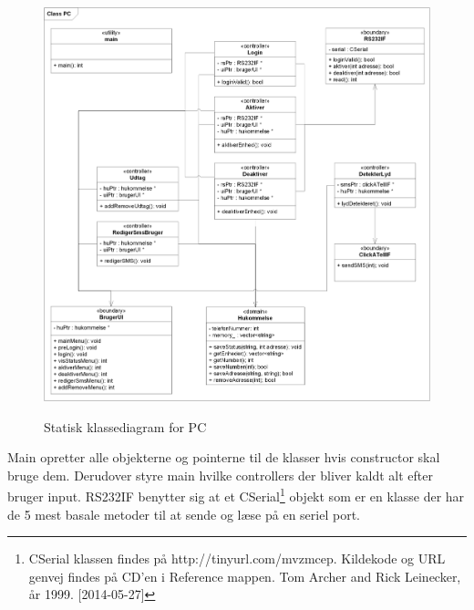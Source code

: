 \clearpage
\vspace*{30 px}
\begin{figure}[H]
     {\includegraphics[width=\textwidth]{billeder/uml/PC_Class_static}}
     \caption{Statisk klassediagram for PC}
     \label{fig:PC_Class_Static}
\end{figure}

Main opretter alle objekterne og pointerne til de klasser hvis constructor skal bruge dem. Derudover styre main hvilke controllers der bliver kaldt alt efter bruger input. RS232IF benytter sig at et CSerial\footnote{CSerial klassen findes på http://tinyurl.com/mvzmcep. Kildekode og URL genvej findes på CD'en i Reference mappen. Tom Archer and Rick Leinecker, år 1999. [2014-05-27] } objekt som er en klasse der har de 5 mest basale metoder til at sende og læse på en seriel port.
%
